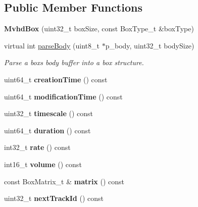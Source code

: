 \subsection*{Public Member Functions}
\begin{DoxyCompactItemize}
\item 
\mbox{\label{classmp4_parser_1_1_mvhd_box_a3165f1bc37f256934843f3dc847accdb}} 
{\bfseries Mvhd\+Box} (uint32\+\_\+t box\+Size, const Box\+Type\+\_\+t \&box\+Type)
\item 
virtual int \mbox{\hyperlink{classmp4_parser_1_1_mvhd_box_accf0bc2bc09ef09f8884e9b27d03b3ac}{parse\+Body}} (uint8\+\_\+t $\ast$p\+\_\+body, uint32\+\_\+t body\+Size)
\begin{DoxyCompactList}\small\item\em Parse a box\textquotesingle{}s body buffer into a box structure. \end{DoxyCompactList}\item 
\mbox{\label{classmp4_parser_1_1_mvhd_box_a0801cebc9ae284b998908ad0c21897e9}} 
uint64\+\_\+t {\bfseries creation\+Time} () const
\item 
\mbox{\label{classmp4_parser_1_1_mvhd_box_a88146558b9d3e39586e74f6af457c082}} 
uint64\+\_\+t {\bfseries modification\+Time} () const
\item 
\mbox{\label{classmp4_parser_1_1_mvhd_box_a5a696e29063c93d94c0eaed08f4cd011}} 
uint32\+\_\+t {\bfseries timescale} () const
\item 
\mbox{\label{classmp4_parser_1_1_mvhd_box_a8b4467b904035d16537830b01487535c}} 
uint64\+\_\+t {\bfseries duration} () const
\item 
\mbox{\label{classmp4_parser_1_1_mvhd_box_aba258732a44d7c3300dc21be42e0169f}} 
int32\+\_\+t {\bfseries rate} () const
\item 
\mbox{\label{classmp4_parser_1_1_mvhd_box_a11c4f46ceb11d19cbf01992a14cf9d6d}} 
int16\+\_\+t {\bfseries volume} () const
\item 
\mbox{\label{classmp4_parser_1_1_mvhd_box_a7c1798724efbb0489b5af27d63e5065d}} 
const Box\+Matrix\+\_\+t \& {\bfseries matrix} () const
\item 
\mbox{\label{classmp4_parser_1_1_mvhd_box_a4a2a72dafecd8cd142b83f9a80514b4f}} 
uint32\+\_\+t {\bfseries next\+Track\+Id} () const
\end{DoxyCompactItemize}

